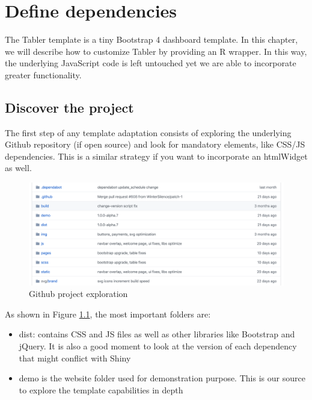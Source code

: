 \documentclass[
]{book}
\providecommand{\tightlist}{%
  \setlength{\itemsep}{0pt}\setlength{\parskip}{0pt}}
\begin{document}
\hypertarget{custom-templates-dependencies}{%
\chapter{Define dependencies}\label{custom-templates-dependencies}}

The Tabler template is a tiny Bootstrap 4 dashboard template. In this chapter, we will describe how to customize Tabler by providing an R wrapper. In this way, the underlying JavaScript code is left untouched yet we are able to incorporate greater functionality.

\hypertarget{discover-the-project}{%
\section{Discover the project}\label{discover-the-project}}

The first step of any template adaptation consists of exploring the underlying Github repository (if open source) and look for mandatory elements, like CSS/JS dependencies. This is a similar strategy if you want to incorporate an htmlWidget as well.

\begin{figure}
\includegraphics[width=32.03in]{images/practice/tabler-github} \caption{Github project exploration}\label{fig:tabler-github}
\end{figure}

As shown in Figure \ref{fig:tabler-github}, the most important folders are:

\begin{itemize}
\tightlist
\item
  dist: contains CSS and JS files as well as other libraries like Bootstrap and jQuery. It is also a good moment to look at the version of each dependency that might conflict with Shiny
\item
  demo is the website folder used for demonstration purpose. This is our source to explore the template capabilities in depth
\end{itemize}
\end{document}
